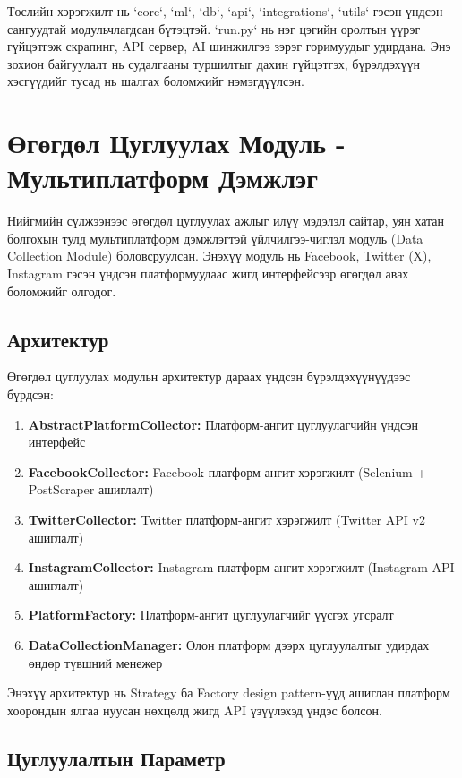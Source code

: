 \documentclass[12pt,a4paper]{report}
\begin{document}
Төслийн хэрэгжилт нь `core`, `ml`, `db`, `api`, `integrations`, `utils` гэсэн үндсэн сангуудтай модульчлагдсан бүтэцтэй. `run.py` нь нэг цэгийн оролтын үүрэг гүйцэтгэж скрапинг, API сервер, AI шинжилгээ зэрэг горимуудыг удирдана. Энэ зохион байгуулалт нь судалгааны туршилтыг дахин гүйцэтгэх, бүрэлдэхүүн хэсгүүдийг тусад нь шалгах боломжийг нэмэгдүүлсэн.


\section{Өгөгдөл Цуглуулах Модуль - Мультиплатформ Дэмжлэг}

Нийгмийн сүлжээнээс өгөгдөл цуглуулах ажлыг илүү мэдэлэл сайтар, уян хатан болгохын тулд мультиплатформ дэмжлэгтэй үйлчилгээ-чиглэл модуль (Data Collection Module) боловсруулсан. Энэхүү модуль нь Facebook, Twitter (X), Instagram гэсэн үндсэн платформуудаас жигд интерфейсээр өгөгдөл авах боломжийг олгодог.

\subsection{Архитектур}

Өгөгдөл цуглуулах модульн архитектур дараах үндсэн бүрэлдэхүүнүүдээс бүрдсэн:

\begin{enumerate}
    \item \textbf{AbstractPlatformCollector:} Платформ-ангит цуглуулагчийн үндсэн интерфейс
    \item \textbf{FacebookCollector:} Facebook платформ-ангит хэрэгжилт (Selenium + PostScraper ашиглалт)
    \item \textbf{TwitterCollector:} Twitter платформ-ангит хэрэгжилт (Twitter API v2 ашиглалт)
    \item \textbf{InstagramCollector:} Instagram платформ-ангит хэрэгжилт (Instagram API ашиглалт)
    \item \textbf{PlatformFactory:} Платформ-ангит цуглуулагчийг үүсгэх угсралт
    \item \textbf{DataCollectionManager:} Олон платформ дээрх цуглуулалтыг удирдах өндөр түвшний менежер
\end{enumerate}

Энэхүү архитектур нь Strategy ба Factory design pattern-үүд ашиглан платформ хоорондын ялгаа нуусан нөхцөлд жигд API үзүүлэхэд үндэс болсон.

\subsection{Цуглуулалтын Параметр}
\end{document}
